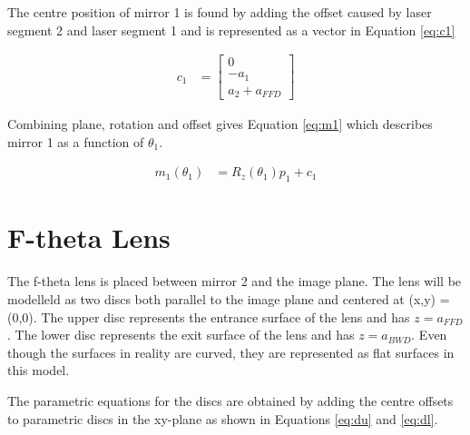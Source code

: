The centre position of mirror 1 is found by adding the offset caused by laser segment 2 and laser segment 1 and is represented as a vector in Equation \ref{eq:c1}

\begin{align}
    c_{1} &=
    \begin{bmatrix}
        0       \\
        -a_{1}  \\
        a_{2} + a_{FFD}
    \end{bmatrix}
    \label{eq:c1}
\end{align}

Combining plane, rotation and offset gives Equation \ref{eq:m1} which describes mirror 1 as a function of $\theta_1$.

\begin{align}
    m_{1}(\theta_1) &= R_{z}(\theta_1) p_{1} + c_{1}
    \label{eq:m1}
\end{align}

\section{F-theta Lens} \label{sec:f-theta-model}

The f-theta lens is placed between mirror 2 and the image plane. The lens will be modelleld as two discs both parallel to the image plane and centered at (x,y) = (0,0). The upper disc represents the entrance surface of the lens and has $z=a_{FFD}$. The lower disc represents the exit surface of the lens and has $z=a_{BWD}$. Even though the surfaces in reality are curved, they are represented as flat surfaces in this model.

The parametric equations for the discs are obtained by adding the centre offsets to parametric discs in the xy-plane as shown in Equations \ref{eq:du} and \ref{eq:dl}.

